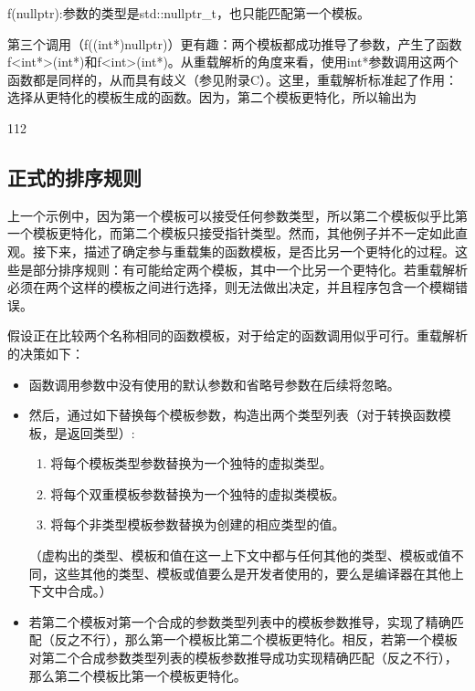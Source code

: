 f(nullptr):参数的类型是std::nullptr\_t，也只能匹配第一个模板。

第三个调用（f((int*)nullptr)）更有趣：两个模板都成功推导了参数，产生了函数f<int*>(int*)和f<int>(int*)。从重载解析的角度来看，使用int*参数调用这两个函数都是同样的，从而具有歧义（参见附录C）。这里，重载解析标准起了作用：选择从更特化的模板生成的函数。因为，第二个模板更特化，所以输出为

\begin{shell}
112
\end{shell}

\subsection{正式的排序规则}

上一个示例中，因为第一个模板可以接受任何参数类型，所以第二个模板似乎比第一个模板更特化，而第二个模板只接受指针类型。然而，其他例子并不一定如此直观。接下来，描述了确定参与重载集的函数模板，是否比另一个更特化的过程。这些是部分排序规则：有可能给定两个模板，其中一个比另一个更特化。若重载解析必须在两个这样的模板之间进行选择，则无法做出决定，并且程序包含一个模糊错误。

假设正在比较两个名称相同的函数模板，对于给定的函数调用似乎可行。重载解析的决策如下：

\begin{itemize}
\item 
函数调用参数中没有使用的默认参数和省略号参数在后续将忽略。

\item 
然后，通过如下替换每个模板参数，构造出两个类型列表（对于转换函数模板，是返回类型）:

\begin{enumerate}
\item 
将每个模板类型参数替换为一个独特的虚拟类型。

\item 
将每个双重模板参数替换为一个独特的虚拟类模板。

\item 
将每个非类型模板参数替换为创建的相应类型的值。
\end{enumerate}

（虚构出的类型、模板和值在这一上下文中都与任何其他的类型、模板或值不同，这些其他的类型、模板或值要么是开发者使用的，要么是编译器在其他上下文中合成。）

\item 
若第二个模板对第一个合成的参数类型列表中的模板参数推导，实现了精确匹配（反之不行），那么第一个模板比第二个模板更特化。相反，若第一个模板对第二个合成参数类型列表的模板参数推导成功实现精确匹配（反之不行），那么第二个模板比第一个模板更特化。
\end{itemize}

